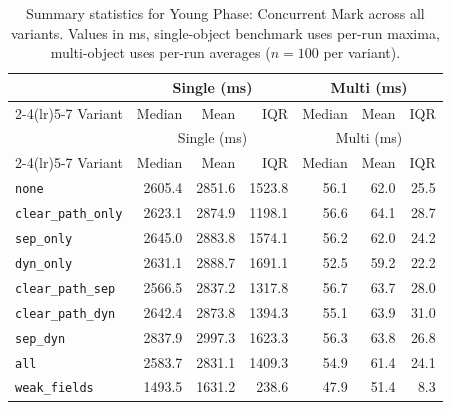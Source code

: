 \begin{longtable}[c]{l rrr rrr}
\caption[Young Phase: Concurrent Mark summary statistics]{Summary statistics for Young Phase: Concurrent Mark across all variants. Values in ms, single-object benchmark uses per-run maxima, multi-object uses per-run averages ($n=100$ per variant).}\label{tab:stats-young_concurrent_mark} \\
\toprule
 & \multicolumn{3}{c}{Single (ms)} & \multicolumn{3}{c}{Multi (ms)} \\
\cmidrule(lr){2-4}\cmidrule(lr){5-7}
Variant & Median & Mean & IQR & Median & Mean & IQR \\
\midrule
\endfirsthead
\toprule
 & \multicolumn{3}{c}{Single (ms)} & \multicolumn{3}{c}{Multi (ms)} \\
\cmidrule(lr){2-4}\cmidrule(lr){5-7}
Variant & Median & Mean & IQR & Median & Mean & IQR \\
\midrule
\endhead
\bottomrule
\endfoot
\texttt{none} & 2605.4 & 2851.6 & 1523.8 & 56.1 & 62.0 & 25.5 \\
\texttt{clear\_path\_only} & 2623.1 & 2874.9 & 1198.1 & 56.6 & 64.1 & 28.7 \\
\texttt{sep\_only} & 2645.0 & 2883.8 & 1574.1 & 56.2 & 62.0 & 24.2 \\
\texttt{dyn\_only} & 2631.1 & 2888.7 & 1691.1 & 52.5 & 59.2 & 22.2 \\
\texttt{clear\_path\_sep} & 2566.5 & 2837.2 & 1317.8 & 56.7 & 63.7 & 28.0 \\
\texttt{clear\_path\_dyn} & 2642.4 & 2873.8 & 1394.3 & 55.1 & 63.9 & 31.0 \\
\texttt{sep\_dyn} & 2837.9 & 2997.3 & 1623.3 & 56.3 & 63.8 & 26.8 \\
\texttt{all} & 2583.7 & 2831.1 & 1409.3 & 54.9 & 61.4 & 24.1 \\
\texttt{weak\_fields} & 1493.5 & 1631.2 & 238.6 & 47.9 & 51.4 & 8.3 \\
\end{longtable}
